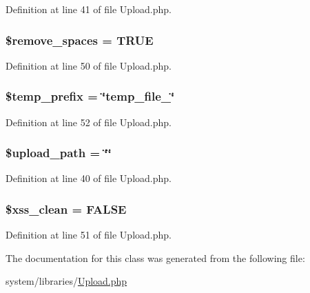 Definition at line 41 of file Upload.\-php.

\hypertarget{class_c_i___upload_ad9f32a52b4b2c16e42a007e0fa832721}{
\subsubsection[{\$remove\-\_\-spaces}]{\setlength{\rightskip}{0pt plus 5cm}\$remove\-\_\-spaces = T\-R\-U\-E}}\label{class_c_i___upload_ad9f32a52b4b2c16e42a007e0fa832721}


Definition at line 50 of file Upload.\-php.

\hypertarget{class_c_i___upload_ab38888cba65ae75bbc5b3841bc69d64a}{
\subsubsection[{\$temp\-\_\-prefix}]{\setlength{\rightskip}{0pt plus 5cm}\$temp\-\_\-prefix = \char`\"{}temp\-\_\-file\-\_\-\char`\"{}}}\label{class_c_i___upload_ab38888cba65ae75bbc5b3841bc69d64a}


Definition at line 52 of file Upload.\-php.

\hypertarget{class_c_i___upload_a38507bf82f955d4b13642a3c7fd6e773}{
\subsubsection[{\$upload\-\_\-path}]{\setlength{\rightskip}{0pt plus 5cm}\$upload\-\_\-path = \char`\"{}\char`\"{}}}\label{class_c_i___upload_a38507bf82f955d4b13642a3c7fd6e773}


Definition at line 40 of file Upload.\-php.

\hypertarget{class_c_i___upload_a0f2ee8861c0b3164a5c6e126dd98c0cc}{
\subsubsection[{\$xss\-\_\-clean}]{\setlength{\rightskip}{0pt plus 5cm}\$xss\-\_\-clean = F\-A\-L\-S\-E}}\label{class_c_i___upload_a0f2ee8861c0b3164a5c6e126dd98c0cc}


Definition at line 51 of file Upload.\-php.



The documentation for this class was generated from the following file\-:\begin{DoxyCompactItemize}
\item 
system/libraries/\hyperlink{_upload_8php}{Upload.\-php}\end{DoxyCompactItemize}
